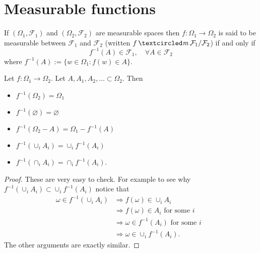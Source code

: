 
\section{Measurable functions}


\begin{definition}
If $(\Omega_1, \mathcal F_1)$ and $(\Omega_2,\mathcal F_2)$ are measurable spaces then $f\colon \Omega_1 \rightarrow \Omega_2$ is said to be {measurable between $\mathcal F_1$ and $\mathcal F_2$} (written $f\mcirc \mathcal F_1/\mathcal F_2$) if and only if
\[ f^{-1}(A)\in \mathcal F_1,\quad\forall A\in\mathcal F_2\]
where $ f^{-1}(A):=\{w\in\Omega_1: f(w)\in A \}$.
\end{definition}


\begin{theorem}
\label{thm pull back basic facts}
Let $f\colon \Omega_1 \rightarrow \Omega_2$. Let $A, A_1, A_2, \ldots \subset \Omega_2$. Then
\begin{itemize}
\item $f^{-1}(\Omega_2) = \Omega_1$
\item $f^{-1}(\varnothing) = \varnothing$
\item $f^{-1}(\Omega_2 - A) = \Omega_1 - f^{-1}(A)$
\item $f^{-1}(\cup_i A_i) =  \cup_i  f^{-1}(A_i)$
\item $f^{-1}(\cap_i A_i) = \cap_i  f^{-1}(A_i)$.
\end{itemize}
\end{theorem}
\begin{proof} These are very easy to check. For example  to see why $f^{-1}(\cup_i A_i) \subset  \cup_i  f^{-1}(A_i)$ notice that
\begin{align*}
\omega \in f^{-1}(\cup_i A_i)
&\Longrightarrow f(\omega) \in \cup_i A_i \\
&\Longrightarrow \text{$f(\omega) \in A_i$ for some $i$ }\\
&\Longrightarrow \text{$\omega \in f^{-1}(A_i)$ for some $i$ }\\
&\Longrightarrow \omega \in \cup_i f^{-1}(A_i).
\end{align*}
The other arguments are exactly similar.
\end{proof}



